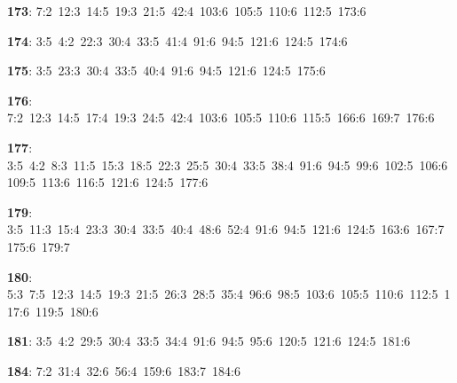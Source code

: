 \noindent \textbf{173}: 7:2\allowbreak\ 12:3\allowbreak\ 14:5\allowbreak\ 19:3\allowbreak\ 21:5\allowbreak\ 42:4\allowbreak\ 103:6\allowbreak\ 105:5\allowbreak\ 110:6\allowbreak\ 112:5\allowbreak\ 173:6\par
\noindent \textbf{174}: 3:5\allowbreak\ 4:2\allowbreak\ 22:3\allowbreak\ 30:4\allowbreak\ 33:5\allowbreak\ 41:4\allowbreak\ 91:6\allowbreak\ 94:5\allowbreak\ 121:6\allowbreak\ 124:5\allowbreak\ 174:6\par
\noindent \textbf{175}: 3:5\allowbreak\ 23:3\allowbreak\ 30:4\allowbreak\ 33:5\allowbreak\ 40:4\allowbreak\ 91:6\allowbreak\ 94:5\allowbreak\ 121:6\allowbreak\ 124:5\allowbreak\ 175:6\par
\noindent \textbf{176}: 7:2\allowbreak\ 12:3\allowbreak\ 14:5\allowbreak\ 17:4\allowbreak\ 19:3\allowbreak\ 24:5\allowbreak\ 42:4\allowbreak\ 103:6\allowbreak\ 105:5\allowbreak\ 110:6\allowbreak\ 115:5\allowbreak\ 166:6\allowbreak\ 169:7\allowbreak\ 176:6\par
\noindent \textbf{177}: 3:5\allowbreak\ 4:2\allowbreak\ 8:3\allowbreak\ 11:5\allowbreak\ 15:3\allowbreak\ 18:5\allowbreak\ 22:3\allowbreak\ 25:5\allowbreak\ 30:4\allowbreak\ 33:5\allowbreak\ 38:4\allowbreak\ 91:6\allowbreak\ 94:5\allowbreak\ 99:6\allowbreak\ 102:5\allowbreak\ 106:6\allowbreak\ 109:5\allowbreak\ 113:6\allowbreak\ 116:5\allowbreak\ 121:6\allowbreak\ 124:5\allowbreak\ 177:6\par
\noindent \textbf{179}: 3:5\allowbreak\ 11:3\allowbreak\ 15:4\allowbreak\ 23:3\allowbreak\ 30:4\allowbreak\ 33:5\allowbreak\ 40:4\allowbreak\ 48:6\allowbreak\ 52:4\allowbreak\ 91:6\allowbreak\ 94:5\allowbreak\ 121:6\allowbreak\ 124:5\allowbreak\ 163:6\allowbreak\ 167:7\allowbreak\ 175:6\allowbreak\ 179:7\par
\noindent \textbf{180}: 5:3\allowbreak\ 7:5\allowbreak\ 12:3\allowbreak\ 14:5\allowbreak\ 19:3\allowbreak\ 21:5\allowbreak\ 26:3\allowbreak\ 28:5\allowbreak\ 35:4\allowbreak\ 96:6\allowbreak\ 98:5\allowbreak\ 103:6\allowbreak\ 105:5\allowbreak\ 110:6\allowbreak\ 112:5\allowbreak\ 117:6\allowbreak\ 119:5\allowbreak\ 180:6\par
\noindent \textbf{181}: 3:5\allowbreak\ 4:2\allowbreak\ 29:5\allowbreak\ 30:4\allowbreak\ 33:5\allowbreak\ 34:4\allowbreak\ 91:6\allowbreak\ 94:5\allowbreak\ 95:6\allowbreak\ 120:5\allowbreak\ 121:6\allowbreak\ 124:5\allowbreak\ 181:6\par
\noindent \textbf{184}: 7:2\allowbreak\ 31:4\allowbreak\ 32:6\allowbreak\ 56:4\allowbreak\ 159:6\allowbreak\ 183:7\allowbreak\ 184:6\par
